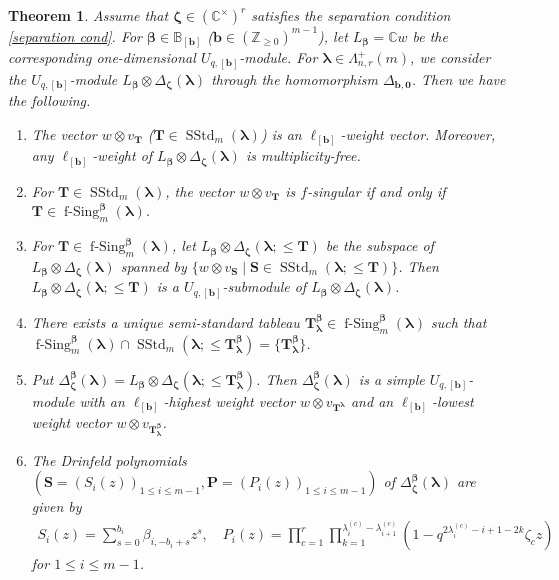 \documentclass[12pt]{amsart}
\newtheorem{thm}{Theorem}[section]
\numberwithin{equation}{thm}
\newcommand\BB{\mathbb B}
\newcommand\CC{\mathbb C}
\newcommand\ZZ{\mathbb Z}
\newcommand\bP{\mathbf P}
\newcommand\bS{\mathbf S}
\newcommand\bT{\mathbf T}
\newcommand\bb{\mathbf b}
\renewcommand\b{\beta}   %
\newcommand\z{\zeta}
\newcommand\la{\lambda}
\newcommand\D{\Delta}
\newcommand\vL{\varLambda}
\newcommand\Bb{\boldsymbol\beta}
\newcommand\Bz{\boldsymbol\zeta}
\newcommand\Bla{\boldsymbol\lambda}
\newcommand{\SStd}{\operatorname{SStd}}
\newcommand{\fSing}{\operatorname{f-Sing}}
\newcounter{ni}
\begin{document}
\begin{thm}
\label{Thm simple LBb Dla} 
Assume that $\Bz \in (\CC^{\times})^r$ satisfies the separation condition \eqref{separation cond}. 
For  $\Bb \in \BB_{[\bb]}$ ($\bb \in (\ZZ_{\geq 0})^{m-1}$), let $L_{\Bb} = \CC w$ 
be the corresponding one-dimensional $U_{q,[\bb]}$-module. 
For $\Bla \in \vL_{n,r}^+(m)$, we consider the $U_{q,[\bb]}$-module 
$L_{\Bb} \otimes \D_{\Bz} (\Bla)$
through the homomorphism $\D_{\bb, \mathbf{0}}$. 
Then we have the following. 
\begin{enumerate}
\item 
The vector $w \otimes v_{\bT}$ ($\bT \in \SStd_m(\Bla)$) is an $\ell_{[\bb]}$-weight vector. 
Moreover, any $\ell_{[\bb]}$-weight of $L_{\Bb} \otimes \D_{\Bz} (\Bla)$ is multiplicity-free. 

\item 
For $\bT \in \SStd_m (\Bla)$, 
the vector $w \otimes v_{\bT}$ is $f$-singular 
if and only if 
$\bT \in \fSing_m^{\Bb} (\Bla)$. 

\item 
For $\bT \in \fSing_m^{\Bb} (\Bla)$, 
let $L_{\Bb} \otimes \D_{\Bz}(\Bla ; \leq \bT)$  be the subspace of $L_{\Bb} \otimes \D_{\Bz}(\Bla)$ 
spanned by $\{ w \otimes v_{\bS} \mid \bS \in \SStd_m (\Bla ; \leq \bT) \}$. 
Then $L_{\Bb} \otimes \D_{\Bz} (\Bla ; \leq \bT)$ is a $U_{q,[\bb]}$-submodule of $L_{\Bb} \otimes \D_{\Bz} (\Bla)$. 

\item 
There exists a unique semi-standard tableau $\bT_{\Bla}^{\Bb}  \in \fSing_m^{\Bb} (\Bla)$ 
such that $\fSing_m^{\Bb} (\Bla) \cap \SStd_m (\Bla ; \leq \bT_{\Bla}^{\Bb}) = \{ \bT_{\Bla}^{\Bb} \}$. 

\item 
Put $\D_{\Bz}^{\Bb} (\Bla) = L_{\Bb} \otimes \D_{\Bz}(\Bla ;\leq \bT_{\Bla}^{\Bb})$. 
Then $\D_{\Bz}^{\Bb} (\Bla)$ is a simple $U_{q,[\bb]}$-module with 
an $\ell_{[\bb]}$-highest weight vector $w \otimes v_{\bT^{\Bla}}$ 
and an $\ell_{[\bb]}$-lowest weight vector $w \otimes v_{\bT_{\Bla}^{\Bb}}$. 

\item 
The Drinfeld polynomials $(\bS=(S_i(z))_{1 \leq i \leq m-1}, \bP = (P_i(z))_{1 \leq i \leq m-1})$ 
of $\D_{\Bz}^{\Bb} (\Bla)$ are given by 
\begin{align*}
S_i(z) = \sum_{s=0}^{b_i} \b_{i, - b_i +s} z^s, 
\quad 
P_i(z) = \prod_{c=1}^r\prod_{k=1}^{\la_i^{(c)} - \la_{i+1}^{(c)}} (1 -   q^{2 \la_i^{(c)} - i+1 -2k} \z_c z)
\end{align*}
for $1 \leq i \leq m-1$. 


\end{enumerate}
\end{thm}
\end{document}
